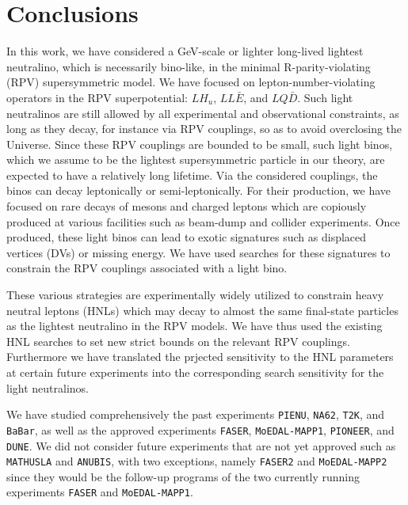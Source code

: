 \section{Conclusions}\label{sec:conclusions}



In this work, we have considered a GeV-scale or lighter long-lived lightest neutralino, 
which is necessarily bino-like, in the minimal R-parity-violating (RPV) supersymmetric model.
We have focused on lepton-number-violating operators in the RPV superpotential: $LH_u$, 
$LL\bar{E}$, and $LQ\bar{D}$. Such light neutralinos are still allowed by all 
experimental and observational constraints, as long as they decay, for instance via RPV couplings, 
so as to avoid overclosing the Universe. Since these RPV couplings are bounded to be small, such 
light binos, which we assume to be the lightest supersymmetric particle in our theory, are expected 
to have a relatively long lifetime. Via the considered couplings, the binos can decay leptonically 
or semi-leptonically. For their production, we have focused on rare decays of 
mesons and charged leptons which are copiously produced at various facilities such as beam-dump and 
collider experiments. Once produced, these light binos can lead to exotic signatures such as 
displaced vertices (DVs) or missing energy.
We have used searches for these signatures to constrain the RPV couplings associated with a light bino.


These various strategies are experimentally widely utilized to constrain heavy neutral leptons 
(HNLs) which may decay to almost the same final-state particles as the lightest neutralino in the 
RPV models. We have thus used the existing HNL searches to set new strict bounds on the relevant 
RPV couplings.
Furthermore we have translated the prjected sensitivity to the HNL parameters at certain future experiments into the corresponding search sensitivity for the light neutralinos.





We have studied comprehensively the past experiments \texttt{PIENU}, 
\texttt{NA62}, \texttt{T2K}, and \texttt{BaBar}, as well as the approved experiments \texttt{FASER}, \texttt{MoEDAL-MAPP1}, \texttt{PIONEER}, and \texttt{DUNE}.
We did not consider future experiments that are not yet approved such as \texttt{MATHUSLA} and \texttt{ANUBIS}, with two exceptions, namely \texttt{FASER2} and \texttt{MoEDAL-MAPP2} since they would be the follow-up programs of the two currently 
running experiments \texttt{FASER} and \texttt{MoEDAL-MAPP1}.


